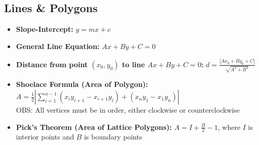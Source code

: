 \subsection{Lines \& Polygons}

\begin{itemize}
    \item \textbf{Slope-Intercept: }$y = mx + c$
    \item \textbf{General Line Equation: }$Ax + By + C = 0$
    \item \textbf{Distance from point $(x_0, y_0)$ to line $Ax + By + C = 0$: }$d = \frac{|Ax_0 + By_0 + C|}{\sqrt{A^2 + B^2}}$
    \item \textbf{Shoelace Formula (Area of Polygon): }$A = \frac{1}{2} |\sum_{i=1}^{n-1}(x_i y_{i+1} - x_{i+1}y_i) + (x_n y_1 - x_1 y_n)|$ \\ OBS: All vertices must be in order, either clockwise or counterclockwise
    \item \textbf{Pick's Theorem (Area of Lattice Polygons): }$A = I + \frac{B}{2} - 1$, where $I$ is interior points and $B$ is boundary points
\end{itemize}
